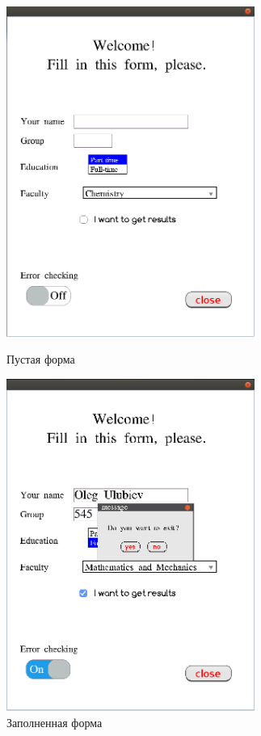 \documentclass[14pt]{extarticle}
\begin{document}
	\begin{figure}[h]
		\begin{center}
		\begin{minipage}[h]{0.4\linewidth}
		\includegraphics[width=230pt]{pictures/demo11.png}
		\caption{ Пустая форма} %
		\label{ris:demo1} %
		\end{minipage}
		\hfill 
		\begin{minipage}[h]{0.4\linewidth}
		\includegraphics[width=230pt]{pictures/demo12.png}
		\caption{Заполненная форма}
		\label{ris:demo2}
		\end{minipage}
		\end{center}
		\end{figure}
		
\end{document}
